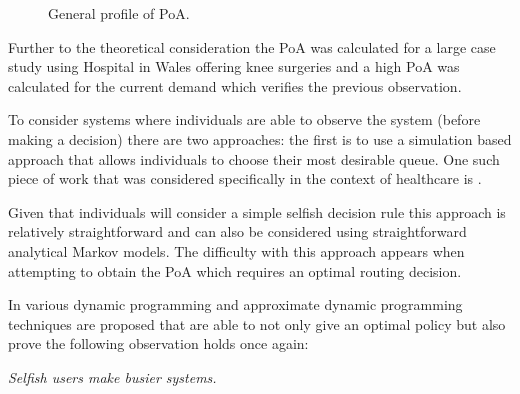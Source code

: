 \documentclass[a4paper,11pt]{article}
\begin{document}
\begin{figure}[!hbtp]
\begin{center}

\end{center}
\caption{General profile of PoA.}\label{fig:poaprofile}
\end{figure}

Further to the theoretical consideration the PoA was calculated for a large case study using Hospital in Wales offering knee surgeries and a high PoA was calculated for the current demand which verifies the previous observation.

To consider systems where individuals are able to observe the system (before making a decision) there are two approaches: the first is to use a simulation based approach that allows individuals to choose their most desirable queue.
One such piece of work that was considered specifically in the context of healthcare is \cite{Knight2010}.

Given that individuals will consider a simple selfish decision rule this approach is relatively straightforward and can also be considered using straightforward analytical Markov models.
The difficulty with this approach appears when attempting to obtain the PoA which requires an optimal routing decision.

In \cite{Shone2014} various dynamic programming and approximate dynamic programming techniques are proposed that are able to not only give an optimal policy but also prove the following observation holds once again:

\begin{center}
\textit{Selfish users make busier systems.}
\end{center}
\end{document}
